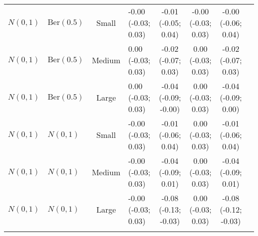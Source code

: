 \begin{table}[ht!]
\begin{tabular}{llclcccc}
\(N(0,1)\) & \(\text{Ber}(0.5)\) & Small & \makecell{-0.00 \\ (-0.03; 0.03)} & \makecell{-0.01 \\ (-0.05; 0.04)} & \makecell{-0.00 \\ (-0.03; 0.03)} & \makecell{-0.00 \\ (-0.06; 0.04)} \\
\(N(0,1)\) & \(\text{Ber}(0.5)\) & Medium & \makecell{0.00 \\ (-0.03; 0.03)} & \makecell{-0.02 \\ (-0.07; 0.03)} & \makecell{0.00 \\ (-0.03; 0.03)} & \makecell{-0.02 \\ (-0.07; 0.03)} \\
\(N(0,1)\) & \(\text{Ber}(0.5)\) & Large & \makecell{0.00 \\ (-0.03; 0.03)} & \makecell{-0.04 \\ (-0.09; -0.00)} & \makecell{0.00 \\ (-0.03; 0.03)} & \makecell{-0.04 \\ (-0.09; 0.00)} \\
\(N(0,1)\) & \(N(0,1)\) & Small & \makecell{-0.00 \\ (-0.03; 0.03)} & \makecell{-0.01 \\ (-0.06; 0.04)} & \makecell{0.00 \\ (-0.03; 0.03)} & \makecell{-0.01 \\ (-0.06; 0.04)} \\
\(N(0,1)\) & \(N(0,1)\) & Medium & \makecell{-0.00 \\ (-0.03; 0.03)} & \makecell{-0.04 \\ (-0.09; 0.01)} & \makecell{0.00 \\ (-0.03; 0.03)} & \makecell{-0.04 \\ (-0.09; 0.01)} \\
\(N(0,1)\) & \(N(0,1)\) & Large & \makecell{-0.00 \\ (-0.03; 0.03)} & \makecell{-0.08 \\ (-0.13; -0.03)} & \makecell{0.00 \\ (-0.03; 0.03)} & \makecell{-0.08 \\ (-0.12; -0.03)} \\
 \bottomrule
 \normalsize
 \end{tabular}
 \end{table}

